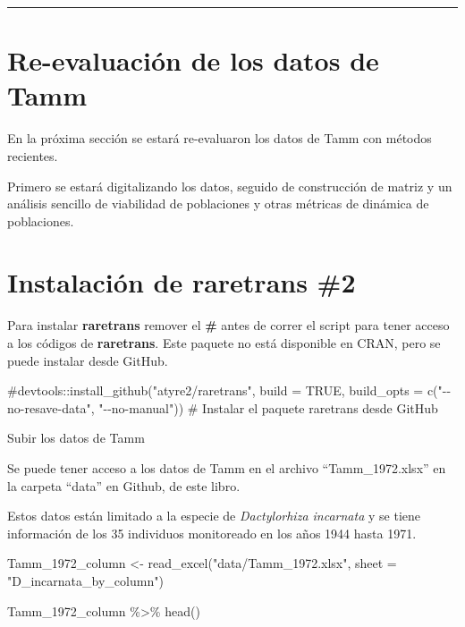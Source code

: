 \documentclass[
  12pt,
  letterpaper,
]{book}
\newenvironment{Shaded}{\begin{snugshade}}{\end{snugshade}}
\newcommand{\AttributeTok}[1]{\textcolor[rgb]{0.40,0.45,0.13}{#1}}
\newcommand{\CommentTok}[1]{\textcolor[rgb]{0.37,0.37,0.37}{#1}}
\newcommand{\FunctionTok}[1]{\textcolor[rgb]{0.28,0.35,0.67}{#1}}
\newcommand{\NormalTok}[1]{\textcolor[rgb]{0.00,0.23,0.31}{#1}}
\newcommand{\OtherTok}[1]{\textcolor[rgb]{0.00,0.23,0.31}{#1}}
\newcommand{\SpecialCharTok}[1]{\textcolor[rgb]{0.37,0.37,0.37}{#1}}
\newcommand{\StringTok}[1]{\textcolor[rgb]{0.13,0.47,0.30}{#1}}
\begin{document}
\begin{center}\rule{0.5\linewidth}{0.5pt}\end{center}

\section{Re-evaluación de los datos de
Tamm}\label{re-evaluaciuxf3n-de-los-datos-de-tamm}

En la próxima sección se estará re-evaluaron los datos de Tamm con
métodos recientes.

Primero se estará digitalizando los datos, seguido de construcción de
matriz y un análisis sencillo de viabilidad de poblaciones y otras
métricas de dinámica de poblaciones.

\section{Instalación de raretrans
\#2}\label{instalaciuxf3n-de-raretrans-2}

Para instalar \textbf{raretrans} remover el \textbf{\#} antes de correr
el script para tener acceso a los códigos de \textbf{raretrans}. Este
paquete no está disponible en CRAN, pero se puede instalar desde GitHub.

\begin{Shaded}
\begin{Highlighting}[]
\CommentTok{\#devtools::install\_github("atyre2/raretrans", build = TRUE, build\_opts = c("{-}{-}no{-}resave{-}data", "{-}{-}no{-}manual")) \# Instalar el paquete \textquotesingle{}raretrans\textquotesingle{} desde GitHub}
\end{Highlighting}
\end{Shaded}

Subir los datos de Tamm

Se puede tener acceso a los datos de Tamm en el archivo
``Tamm\_1972.xlsx'' en la carpeta ``data'' en Github, de este libro.

Estos datos están limitado a la especie de \emph{Dactylorhiza incarnata}
y se tiene información de los 35 individuos monitoreado en los años 1944
hasta 1971.

\begin{Shaded}
\begin{Highlighting}[]
\NormalTok{Tamm\_1972\_column }\OtherTok{\textless{}{-}} \FunctionTok{read\_excel}\NormalTok{(}\StringTok{"data/Tamm\_1972.xlsx"}\NormalTok{, }
    \AttributeTok{sheet =} \StringTok{"D\_incarnata\_by\_column"}\NormalTok{)}

\NormalTok{Tamm\_1972\_column }\SpecialCharTok{\%\textgreater{}\%} \FunctionTok{head}\NormalTok{()}
\end{Highlighting}
\end{Shaded}
\end{document}
